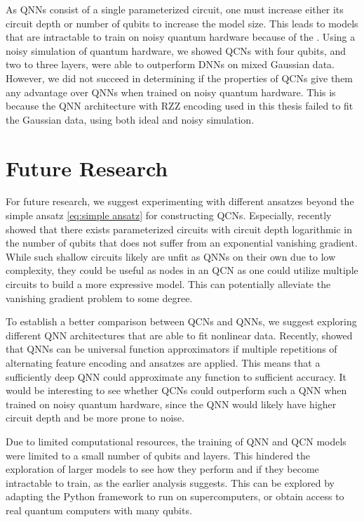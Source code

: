 As QNNs consist of a single parameterized circuit, one must increase either its circuit depth or number of qubits to increase the model size. This leads to models that are intractable to train on noisy quantum hardware because of the . Using a noisy simulation of quantum hardware, we showed QCNs with four qubits, and two to three layers, were able to outperform DNNs on mixed Gaussian data. However, we did not succeed in determining if the properties of QCNs give them any advantage over QNNs when trained on noisy quantum hardware. This is because the QNN architecture with RZZ encoding used in this thesis failed to fit the Gaussian data, using both ideal and noisy simulation. 


\section{Future Research}\label{sec:future}
For future research, we suggest experimenting with different ansatzes beyond the simple ansatz \cref{eq:simple ansatz} for constructing QCNs. Especially, \citet{Cerezo_2021} recently showed that there exists parameterized circuits with circuit depth logarithmic in the number of qubits that does not suffer from an exponential vanishing gradient. While such shallow circuits likely are unfit as QNNs on their own due to low complexity, they could be useful as nodes in an QCN as one could utilize multiple circuits to build a more expressive model. This can potentially alleviate the vanishing gradient problem to some degree.

To establish a better comparison between QCNs and QNNs, we suggest exploring different QNN architectures that are able to fit nonlinear data. Recently, \citet{Schuld_2021} showed that QNNs can be universal function approximators if multiple repetitions of alternating feature encoding and ansatzes are applied. This means that a sufficiently deep QNN could approximate any function to sufficient accuracy. It would be interesting to see whether QCNs could outperform such a QNN when trained on noisy quantum hardware, since the QNN would likely have higher circuit depth and be more prone to noise.

Due to limited computational resources, the training of QNN and QCN models were limited to a small number of qubits and layers. This hindered the exploration of larger models to see how they perform and if they become intractable to train, as the earlier analysis suggests. This can be explored by adapting the Python framework to run on supercomputers, or obtain access to real quantum computers with many qubits.


